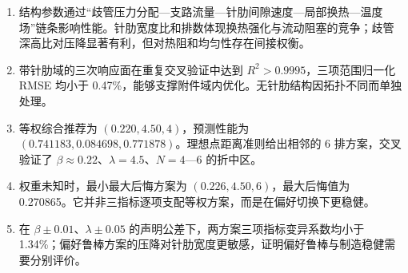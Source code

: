 \documentclass[12pt]{article}
\newcommand{\subsect}[1]{\par\vspace{6pt}\noindent{\fontsize{12pt}{17pt}\selectfont\hei #1}\par\vspace{2pt}}
\begin{document}
\subsect{5.6\quad 结论}
\begin{enumerate}[leftmargin=2.5em,itemsep=0pt]
  \item 结构参数通过``歧管压力分配—支路流量—针肋间隙速度—局部换热—温度场''链条影响性能。针肋宽度比和排数体现换热强化与流动阻塞的竞争；歧管深高比对压降显著有利，但对热阻和均匀性存在间接权衡。
  \item 带针肋域的三次响应面在重复交叉验证中达到 $R^{2} > 0.9995$，三项范围归一化 RMSE 均小于 0.47\%，能够支撑附件域内优化。无针肋结构因拓扑不同而单独处理。
  \item 等权综合推荐为 $(0.220, 4.50, 4)$，预测性能为 $(0.741183, 0.084698, 0.771878)$。理想点距离准则给出相邻的 6 排方案，交叉验证了 $\beta \approx 0.22$、$\lambda = 4.5$、$N = 4$—6 的折中区。
  \item 权重未知时，最小最大后悔方案为 $(0.226, 4.50, 6)$，最大后悔值为 0.270865。它并非三指标逐项支配等权方案，而是在偏好切换下更稳健。
  \item 在 $\beta \pm 0.01$、$\lambda \pm 0.05$ 的声明公差下，两方案三项指标变异系数均小于 1.34\%；偏好鲁棒方案的压降对针肋宽度更敏感，证明偏好鲁棒与制造稳健需要分别评价。
\end{enumerate}
\end{document}
